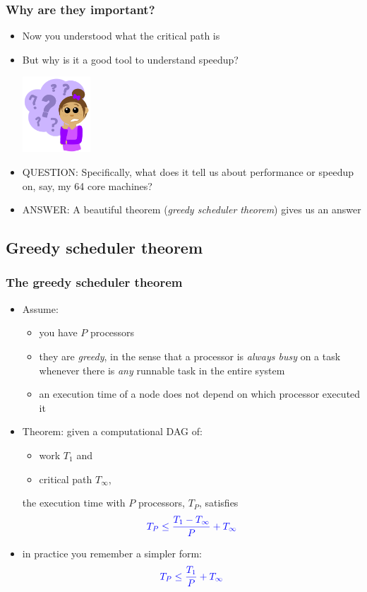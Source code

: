 \documentclass[12pt,dvipdfmx]{beamer}
\newcommand{\ao}[1]{{\color{blue}#1}}
\newcommand{\aka}[1]{{\color{red}#1}}
\begin{document}
\begin{frame}
\frametitle{Why are they important?}

\begin{itemize}
\item<1-> Now you understood what the critical path is

\item<2-> But why is it a good tool to
  understand speedup?

\begin{center}
\includegraphics[width=0.2\textwidth]{out/pdf/svg/Question_Girl.pdf}  
\end{center}

\item<3-> \aka{QUESTION:} Specifically, what does it tell us about 
  performance or speedup on, say, my 64 core machines?

\item<4-> \ao{ANSWER:} A beautiful theorem 
  (\ao{\em greedy scheduler theorem}) gives us an answer
\end{itemize}
\end{frame}


\subsection{Greedy scheduler theorem}
\begin{frame}
\frametitle{The greedy scheduler theorem}

\begin{itemize}
\item<1-> Assume:
  \begin{itemize}
  \item you have $P$ processors
  \item they are \ao{\em greedy}, in the sense that 
    a processor is \ao{\em always busy} on a task whenever 
    there is \ao{\em any} runnable task in the entire system
  \item an execution time of a node does not depend on
    which processor executed it
  \end{itemize}

\item<2-> Theorem: 
  given a computational DAG of:
  \begin{itemize}
  \item work $T_1$ and
  \item critical path $T_\infty$,
  \end{itemize}
  the execution time 
  with $P$ processors, \ao{$T_P$}, satisfies
  \[ \ao{T_P \leq \frac{T_1 - T_\infty}{P} + T_\infty} \]

\item<3-> in practice you remember a simpler form:
  \[ \ao{T_P \leq \frac{T_1}{P} + T_\infty} \]
\end{itemize}
\end{frame}
\end{document}
